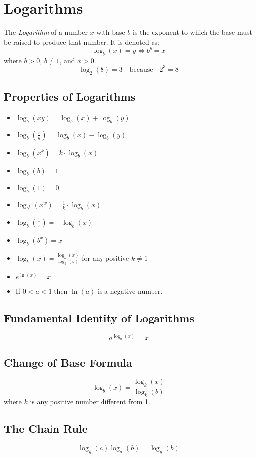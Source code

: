 \section{Logarithms}

The \emph{Logarithm} of a number \(x\) 
with base \(b\) is the exponent to which the base must be raised to produce that number. It is denoted as:
  \[
    \log_b(x) = y \iff b^y = x
  \]
where \(b > 0\), \(b \neq 1\), and \(x > 0\).
  \[
    \log_2(8) = 3 \quad \text{because} \quad 2^3 = 8
  \]


\subsection{Properties of Logarithms}
\begin{itemize}[label=\(-\)]
  \item \(\log_b(xy) = \log_b(x) + \log_b(y)\)
  \item \(\log_b\left(\frac{x}{y}\right) = \log_b(x) - \log_b(y)\)
  \item \(\log_b(x^k) = k \cdot \log_b(x)\)
  \item \(\log_b(b) = 1\)
  \item \(\log_b(1) = 0\)
  \item \(\log_{b^k}(x^w) = \frac{1}{k} \cdot \log_b(x)\)
  \item \(\log_b\left(\frac{1}{x}\right) = -\log_b(x)\)
  \item \(\log_b(b^x) = x\)
  \item \(\log_b(x) = \frac{\log_k(x)}{\log_k(b)}\) for any positive \(k \neq 1\)
  \item \(e^{\ln(x)} = x\)
  \item If \(0 < a < 1\) then \(\ln(a)\) is a negative number. 
\end{itemize}

\subsection{Fundamental Identity of Logarithms}
\[
a^{\log_a(x)} = x
\]

\subsection{Change of Base Formula}
\[
\log_b(x) = \frac{\log_k(x)}{\log_k(b)}
\]
where \(k\) is any positive number different from 1.

\subsection{The Chain Rule}
\[
    \log_y(a) \log_a(b) = \log_y(b)
\]

